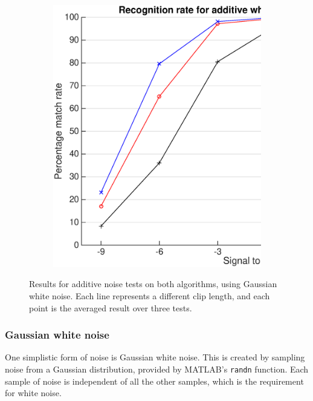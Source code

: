 \documentclass[12pt,a4paper,twoside,openright]{report}
\begin{document}
\begin{figure}[p]
    \begin{subfigure}{\textwidth}
      \includegraphics[width=\textwidth]{./figs/gaussian_shazam_results.eps} 
    \end{subfigure}

    \vspace{15mm}

    \caption{Results for additive noise tests on both algorithms, using Gaussian white noise. Each line represents a different clip length, and each point is the averaged result over three tests.}
    \label{fig:gaussian_results}
\end{figure}


\subsubsection{Gaussian white noise}

One simplistic form of noise is Gaussian white noise. This is created by sampling noise from a Gaussian distribution, provided by MATLAB's \lstinline{randn} function. Each sample of noise is independent of all the other samples, which is the requirement for white noise.
\end{document}

